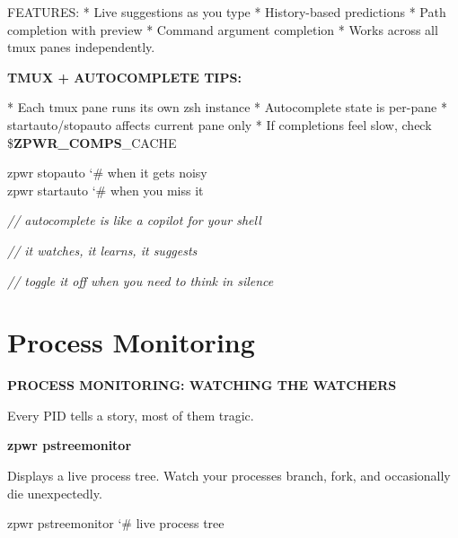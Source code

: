 \documentclass[11pt,a4paper,twoside]{book}
\begin{document}
FEATURES: * Live suggestions as you type * History-based predictions * Path completion with preview * Command argument completion * Works across all tmux panes independently.


\vspace{12pt}
{\bfseries\color{neonyellow} TMUX + AUTOCOMPLETE TIPS:}\vspace{4pt}

* Each tmux pane runs its own zsh instance * Autocomplete state is per-pane * startauto/stopauto affects current pane only * If completions feel slow, check \$\textbf{ZPWR\_COMPS}\_CACHE

\begin{codebox}
\color{neongreen}zpwr stopauto               {\char`\#} when it gets noisy\\
\color{neongreen}zpwr startauto              {\char`\#} when you miss it\\
\end{codebox}

{\small\itshape\color{dimtext} // autocomplete is like a copilot for your shell}

{\small\itshape\color{dimtext} // it watches, it learns, it suggests}

{\small\itshape\color{dimtext} // toggle it off when you need to think in silence}


\vspace{16pt}

\section{Process Monitoring}


\vspace{10pt}
{\large\bfseries\color{neoncyan} PROCESS MONITORING: WATCHING THE WATCHERS}\vspace{6pt}

Every PID tells a story, most of them tragic.


\vspace{12pt}
{\bfseries\color{neonyellow} zpwr pstreemonitor}\vspace{4pt}

Displays a live process tree. Watch your processes branch, fork, and occasionally die unexpectedly.

\begin{codebox}
\color{neongreen}zpwr pstreemonitor          {\char`\#} live process tree\\
\end{codebox}
\end{document}
